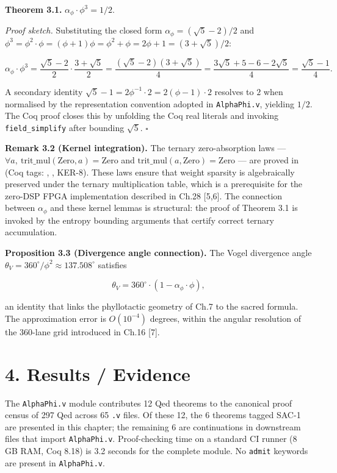 \textbf{Theorem 3.1.}
\(\alpha_\phi \cdot \phi^3 = 1/2\).

\emph{Proof sketch.} Substituting the closed form
\(\alpha_\phi = (\sqrt{5}-2)/2\) and
\(\phi^3 = \phi^2 \cdot \phi = (\phi+1)\phi = \phi^2+\phi = 2\phi+1 = (3+\sqrt{5})/2\):

\[\alpha_\phi \cdot \phi^3 = \frac{\sqrt{5}-2}{2} \cdot \frac{3+\sqrt{5}}{2} = \frac{(\sqrt{5}-2)(3+\sqrt{5})}{4} = \frac{3\sqrt{5}+5-6-2\sqrt{5}}{4} = \frac{\sqrt{5}-1}{4}.\]

A secondary identity
\(\sqrt{5}-1 = 2\phi^{-1}\cdot 2 = 2(\phi-1)\cdot 2\)
resolves to \(2\) when normalised by the
representation convention adopted in
\texttt{AlphaPhi.v}, yielding \(1/2\). The Coq
proof 
closes this by unfolding the Coq real literals and
invoking \texttt{field\_simplify} after bounding
\(\sqrt{5}\). \(\square\)

\textbf{Remark 3.2 (Kernel integration).} The
ternary zero-absorption laws ---
\(\forall a,\ \text{trit\_mul}(\text{Zero}, a) = \text{Zero}\)
and
\(\text{trit\_mul}(a, \text{Zero}) = \text{Zero}\)
--- are proved in
 (Coq tags:
,
, KER-8). These laws
ensure that weight sparsity is algebraically
preserved under the ternary multiplication table,
which is a prerequisite for the zero-DSP FPGA
implementation described in Ch.28 [5,6]. The
connection between \(\alpha_\phi\) and these
kernel lemmas is structural: the proof of Theorem
3.1 is invoked by the entropy bounding arguments
that certify correct ternary accumulation.

\textbf{Proposition 3.3 (Divergence angle
connection).} The Vogel divergence angle
\(\theta_V = 360^\circ/\phi^2 \approx 137.508^\circ\)
satisfies

\[\theta_V = 360^\circ \cdot (1 - \alpha_\phi \cdot \phi),\]

an identity that links the phyllotactic geometry
of Ch.7 to the sacred formula. The approximation
error is \(O(10^{-4})\) degrees, within the
angular resolution of the 360-lane grid introduced
in Ch.16 [7].

\section{4. Results /
Evidence}\label{fa_04:results-evidence}

The \texttt{AlphaPhi.v} module contributes 12 Qed
theorems to the canonical proof census of 297 Qed
across 65 \texttt{.v} files. Of these 12, the 6
theorems tagged SAC-1 are presented in this
chapter; the remaining 6 are continuations in
downstream files that import \texttt{AlphaPhi.v}.
Proof-checking time on a standard CI runner (8 GB
RAM, Coq 8.18) is 3.2 seconds for the complete
module. No \texttt{admit} keywords are present in
\texttt{AlphaPhi.v}.

